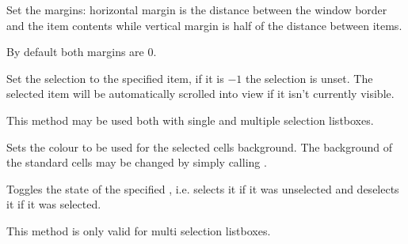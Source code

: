 \label{wxvlistboxsetmargins}



Set the margins: horizontal margin is the distance between the window
border and the item contents while vertical margin is half of the
distance between items.

By default both margins are $0$.


\label{wxvlistboxsetselection}


Set the selection to the specified item, if it is $-1$ the selection is
unset. The selected item will be automatically scrolled into view if it isn't
currently visible.

This method may be used both with single and multiple selection listboxes.


\label{wxvlistboxsetselectionbackground}


Sets the colour to be used for the selected cells background. The background of
the standard cells may be changed by simply calling 
.




\label{wxvlistboxtoggle}


Toggles the state of the specified , i.e. selects it if it was
unselected and deselects it if it was selected.

This method is only valid for multi selection listboxes.



